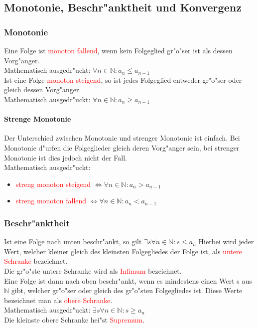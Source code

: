 \subsection{Monotonie, Beschr"anktheit und Konvergenz}
\subsubsection{Monotonie}
Eine Folge ist \textcolor{red}{monoton fallend}, wenn kein Folgeglied gr"o"ser ist als dessen Vorg"anger.\\
Mathematisch ausgedr"uckt: $\forall n\in{\mathbb{N}}: a_n \leq a_{n-1}$\\
Ist eine Folge \textcolor{red}{monoton steigend}, so ist jedes Folgeglied entweder gr"o"ser oder gleich dessen Vorg"anger.\\
Mathematisch ausgedr"uckt: $\forall n\in{\mathbb{N}}: a_n \geq a_{n-1}$\\

\paragraph{Strenge Monotonie} 
Der Unterschied zwischen Monotonie und strenger Monotonie ist einfach. Bei Monotonie d"urfen die Folgeglieder gleich deren Vorg"anger sein, bei strenger Monotonie ist dies jedoch nicht der Fall.
\\

Mathematisch ausgedr"uckt:
\begin{itemize}
\item \textcolor{red}{streng monoton steigend} $\Leftrightarrow \forall n\in\mathbb{N}: a_n > a_{n-1}$
\item \textcolor{red}{streng monoton fallend} $\Leftrightarrow \forall n\in\mathbb{N}: a_n < a_{n-1}$
\end{itemize}

\subsubsection{Beschr"anktheit}
Ist eine Folge nach unten beschr"ankt, so gilt $\exists s \forall n\in{\mathbb{N}}: s\leq a_n $
Hierbei wird jeder Wert, welcher kleiner gleich des kleinsten Folgegliedes der Folge ist, als \textcolor{red}{untere Schranke} bezeichnet.\\
Die gr"o"ste untere Schranke wird als \textcolor{red}{Infimum} bezeichnet.\\
Eine Folge ist dann nach oben beschr"ankt, wenn es mindestens einen Wert s aus $\mathbb{N}$ gibt, welcher gr"o"ser oder gleich des gr"o"sten Folgegliedes ist. Diese Werte bezeichnet man als \textcolor{red}{obere Schranke}.\\
Mathematisch ausgedr"uckt: $\exists s \forall n\in{\mathbb{N}}: s\geq a_n $\\
Die kleinste obere Schranke hei"st \textcolor{red}{Supremum}.

